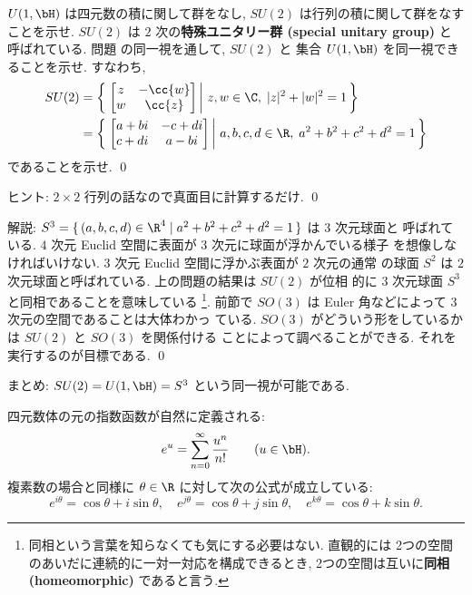 \documentclass[12pt,twoside]{jarticle}
\begin{document}
\begin{question}
\label{q:U(1,H)=SU(2)}
  $U(1,\bH)$ は四元数の積に関して群をなし,
  $SU(2)$ は行列の積に関して群をなすことを示せ. 
  $SU(2)$ は $2$ 次の{\bf 特殊ユニタリー群 (special unitary group)} と
  呼ばれている.  
  問題  の同一視を通して, 
  $SU(2)$ と
  集合 $U(1,\bH)$ を同一視できることを示せ.  すなわち,
  \begin{align*}
    SU(2) &= 
    \left\{\,\left.
      \begin{bmatrix}
        z & -\cc{w} \\
        w &  \cc{z} \\
      \end{bmatrix}
    \,\right|\,
      z,w\in\C,\; |z|^2+|w|^2=1
    \,\right\}
    \\
    &=
    \left\{\,\left.
      \begin{bmatrix}
        a+bi & -c+di \\
        c+di &  a-bi \\
      \end{bmatrix}
    \,\right|\,
      a,b,c,d\in\R,\; a^2+b^2+c^2+d^2=1
    \,\right\}
  \end{align*}
  であることを示せ.  \qed
\end{question}

\noindent
ヒント: $2\times 2$ 行列の話なので真面目に計算するだけ.
\qed

\medskip
\noindent
解説: $S^3=\{\,(a,b,c,d)\in\R^4\mid a^2+b^2+c^2+d^2=1\,\}$ は $3$ 次元球面と
呼ばれている.  $4$ 次元 Euclid 空間に表面が $3$ 次元に球面が浮かんでいる様子
を想像しなければいけない.  $3$ 次元 Euclid 空間に浮かぶ表面が $2$ 次元の通常
の球面 $S^2$ は $2$ 次元球面と呼ばれている.  上の問題の結果は $SU(2)$ が位相
的に $3$ 次元球面 $S^3$ と同相であることを意味している%
\footnote{同相という言葉を知らなくても気にする必要はない. 直観的には
  2つの空間のあいだに連続的に一対一対応を構成できるとき, 
  2つの空間は互いに{\bf 同相 (homeomorphic)} であると言う.}.  %
前節で $SO(3)$ は Euler 角などによって $3$ 次元の空間であることは大体わかっ
ている.  $SO(3)$ がどういう形をしているかは $SU(2)$ と $SO(3)$ を関係付ける
ことによって調べることができる.  それを実行するのが目標である.
\qed

\bigskip
\noindent
{\Large まとめ: $SU(2)=U(1,\bH)=S^3$ という同一視が可能である.}
\bigskip


四元数体の元の指数函数が自然に定義される:
\begin{equation*}
  e^u = \sum_{n=0}^\infty \frac{u^n}{n!}
  \qquad (u\in\bH).
\end{equation*}
複素数の場合と同様に $\theta\in\R$ に対して次の公式が成立している:
\begin{equation*}
  e^{i\theta} = \cos\theta + i\sin\theta, \quad
  e^{j\theta} = \cos\theta + j\sin\theta, \quad
  e^{k\theta} = \cos\theta + k\sin\theta.
\end{equation*}
\end{document}
